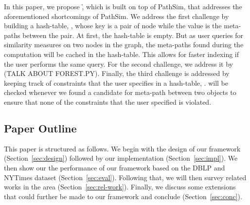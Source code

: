In this paper, we propose \h, which is built on top of PathSim, that addresses
the aforementioned shortcomings of PathSim. We address the first challenge
by building a hash-table, \mTable, whose key is a pair of node while the value is
the meta-paths between the pair. At first, the hash-table is empty. But as
user queries for similarity measures on two nodes in the graph, the meta-paths
found during the computation will be cached in the hash-table. This
allows for faster indexing if the user performs the same query. For the
second challenge, we address it by (TALK ABOUT FOREST.PY). Finally,
the third challenge is addressed by keeping track of constraints that
the user specifies in a hash-table, \cTable. \cTable will be
checked whenever we found a candidate for meta-path between two objects
to ensure that none of the constraints that the user specified is
violated.

\subsection{Paper Outline}

This paper is structured as follows. We begin with the design of our framework
(Section~\ref{sec:design}) followed by our implementation
(Section~\ref{sec:impl}). We then show our the performance of our framework
based on the DBLP and NYTimes dataset (Section~\ref{sec:eval}). Following that,
we will then survey related works in the area (Section~\ref{sec:rel-work}).
Finally, we discuss some extensions that could further be made to our framework
and conclude (Section~\ref{sec:conc}).

